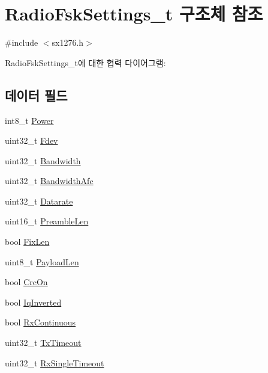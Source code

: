 \hypertarget{struct_radio_fsk_settings__t}{}\section{Radio\+Fsk\+Settings\+\_\+t 구조체 참조}
\label{struct_radio_fsk_settings__t}


{\ttfamily \#include $<$sx1276.\+h$>$}



Radio\+Fsk\+Settings\+\_\+t에 대한 협력 다이어그램\+:
\subsection*{데이터 필드}
\begin{DoxyCompactItemize}
\item 
int8\+\_\+t \mbox{\hyperlink{struct_radio_fsk_settings__t_a6ebc6ad47329ddd2d5e0d30ae0310a1e}{Power}}
\item 
uint32\+\_\+t \mbox{\hyperlink{struct_radio_fsk_settings__t_aae7d47b98bf3e853d76b63a4923df37a}{Fdev}}
\item 
uint32\+\_\+t \mbox{\hyperlink{struct_radio_fsk_settings__t_a318fb6591ed9e732fef8c459c246e8cb}{Bandwidth}}
\item 
uint32\+\_\+t \mbox{\hyperlink{struct_radio_fsk_settings__t_a6f8e2d2bd8e8f21428d582dc8a003eea}{Bandwidth\+Afc}}
\item 
uint32\+\_\+t \mbox{\hyperlink{struct_radio_fsk_settings__t_a4bac4b1fd8c58112bafb1514fc95ad46}{Datarate}}
\item 
uint16\+\_\+t \mbox{\hyperlink{struct_radio_fsk_settings__t_aba9cfa7d2470ee0e474fa6442d68f994}{Preamble\+Len}}
\item 
bool \mbox{\hyperlink{struct_radio_fsk_settings__t_a5595c2171f2df06f2dc36c58902eb890}{Fix\+Len}}
\item 
uint8\+\_\+t \mbox{\hyperlink{struct_radio_fsk_settings__t_aaa50a56616dec6cdf36915d97722c413}{Payload\+Len}}
\item 
bool \mbox{\hyperlink{struct_radio_fsk_settings__t_a97bd90b59a970e4bb2195cf648a380d3}{Crc\+On}}
\item 
bool \mbox{\hyperlink{struct_radio_fsk_settings__t_ae72a925b57b29eb0c1fcd0334a972c0a}{Iq\+Inverted}}
\item 
bool \mbox{\hyperlink{struct_radio_fsk_settings__t_ad155d9bae95f09d927ca588dc4f4734a}{Rx\+Continuous}}
\item 
uint32\+\_\+t \mbox{\hyperlink{struct_radio_fsk_settings__t_a51e578bc6e36b50abdbf3c91be46bc5b}{Tx\+Timeout}}
\item 
uint32\+\_\+t \mbox{\hyperlink{struct_radio_fsk_settings__t_a9b3685b3004d4b5e89875b2fe6324e74}{Rx\+Single\+Timeout}}
\end{DoxyCompactItemize}


